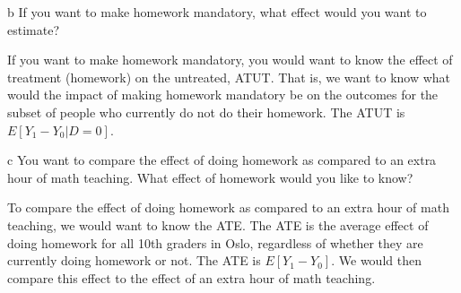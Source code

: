 \documentclass{article}
\begin{document}
\begin{problem}{b}
If you want to make homework mandatory, what effect would you want to estimate?
\end{problem}
\begin{solution}
If you want to make homework mandatory, you would want to know the effect of treatment (homework) on the untreated, ATUT. That is, we want to know what would the impact of making homework mandatory be on the outcomes for the subset of people who currently do not do their homework. The ATUT is $E[Y_1-Y_0|D=0]$. 
\end{solution}

\begin{problem}{c}
You want to compare the effect of doing homework as compared to an extra hour of math teaching. What effect of homework would you like to know?
\end{problem}
\begin{solution}
To compare the effect of doing homework as compared to an extra hour of math teaching, we would want to know the ATE. The ATE is the average effect of doing homework for all 10th graders in Oslo, regardless of whether they are currently doing homework or not. The ATE is $E[Y_1-Y_0]$. We would then compare this effect to the effect of an extra hour of math teaching.
\end{solution}
\end{document}

